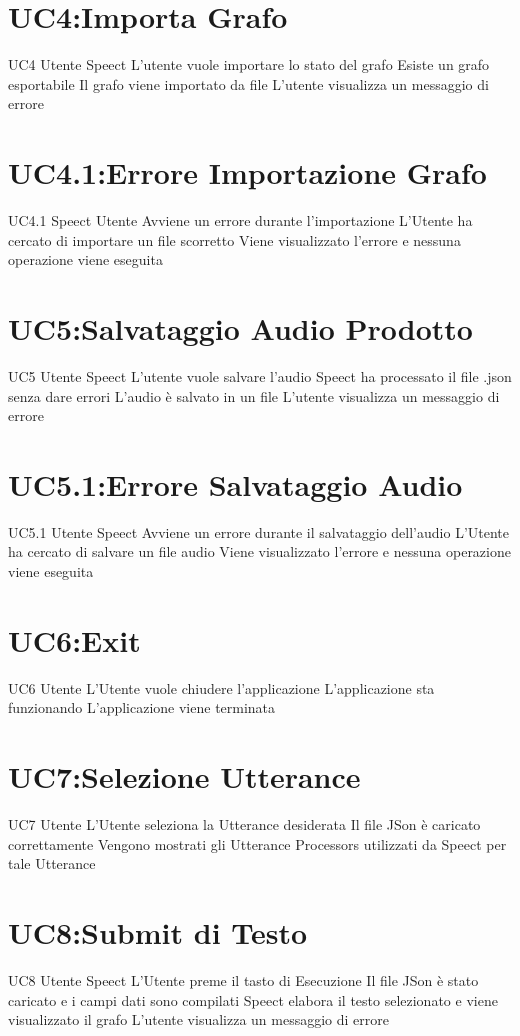\documentclass[../AnalisideiRequisiti.tex]{subfiles}
\begin{document}
\section{UC4:Importa Grafo}
\UserCase
{UC4}
{Utente}
{Speect}
{L'utente vuole importare lo stato del grafo}
{Esiste un grafo esportabile}
{Il grafo viene importato da file}
{L'utente visualizza un messaggio di errore }
{}
\section{UC4.1:Errore Importazione Grafo}
\UserCase
{UC4.1}
{Speect}
{Utente}
{Avviene un errore durante l'importazione}
{L'Utente ha cercato di importare un file scorretto}
{Viene visualizzato l'errore e nessuna operazione viene eseguita}
{}
{}
\section{UC5:Salvataggio Audio Prodotto}
\UserCase
{UC5}
{Utente}
{Speect}
{L'utente vuole salvare l'audio}
{Speect ha processato il file .json senza dare errori}
{L'audio è salvato in un file}
{L'utente visualizza un messaggio di errore }
{}
\section{UC5.1:Errore Salvataggio Audio}
\UserCase
{UC5.1}
{Utente}
{Speect}
{Avviene un errore durante il salvataggio dell'audio}
{L'Utente ha cercato di salvare un file audio}
{Viene visualizzato l'errore e nessuna operazione viene eseguita}
{}
{}
\section{UC6:Exit}
\UserCase
{UC6}
{Utente}
{}
{L'Utente vuole chiudere l'applicazione }
{L'applicazione sta funzionando}
{L'applicazione viene terminata}
{}
{
}

\section{UC7:Selezione Utterance}
\UserCase
{UC7}
{Utente}
{}
{L'Utente seleziona la Utterance desiderata }
{Il file JSon è caricato correttamente}
{Vengono mostrati gli Utterance Processors utilizzati da Speect per tale Utterance}
{}
{}

\section{UC8:Submit di Testo}
\UserCase
{UC8}
{Utente}
{Speect}
{L'Utente preme il tasto di Esecuzione }
{Il file JSon è stato caricato e i campi dati sono compilati}
{Speect elabora il testo selezionato e viene visualizzato il grafo}
{L'utente visualizza un messaggio di errore }
{}
\end{document}
